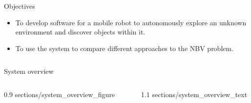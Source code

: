 \documentclass[final]{beamer}
\newlength{\sepwid}
\newlength{\onecolwid}
\newlength{\twocolwid}
\begin{document}
\begin{frame}[t]
\begin{columns}[t]
\begin{column}{\twocolwid}
\begin{columns}[t,totalwidth=\twocolwid]
\begin{column}{\onecolwid}
\begin{block}{Objectives}
			\begin{itemize}
				\item To develop software for a mobile robot to autonomously explore an unknown environment and discover objects within it.
				\item To use the system to compare different approaches to the NBV problem.
			\end{itemize}

			\end{block}

		\end{column}

	\end{columns}






	\begin{block}{System overview}

	\begin{columns}[c,totalwidth=\twocolwid]

		\begin{column}{0.9\onecolwid}
			{sections/system_overview_figure}
		\end{column}

		\begin{column}{\sepwid}
		\end{column} %

		\begin{column}{1.1\onecolwid}
			{sections/system_overview_text}
		\end{column}

	\end{columns}


\end{block}
\end{column}
\end{columns}
\end{frame}
\end{document}
